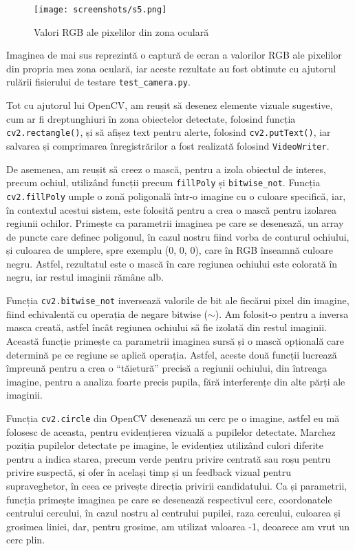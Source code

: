 \documentclass[12pt,a4paper]{article}
\begin{document}
\begin{figure}[H]
    \centering
    \texttt{[image: screenshots/s5.png]}
    \caption{Valori RGB ale pixelilor din zona oculară}
    \label{fig:rgb_ochi}
\end{figure}

Imaginea de mai sus reprezintă o captură de ecran a valorilor RGB ale
pixelilor din propria mea zona oculară, iar aceste rezultate au fost obtinute cu ajutorul rulării fisierului de testare \texttt{test\_camera.py}.


Tot cu ajutorul lui OpenCV, am reușit să desenez elemente vizuale
sugestive, cum ar fi dreptunghiuri în zona obiectelor detectate,
folosind funcția \texttt{cv2.rectangle()}, și să afișez text pentru alerte,
folosind \texttt{cv2.putText()}, iar salvarea și comprimarea înregistrărilor a
fost realizată folosind \texttt{VideoWriter}.

De asemenea, am reușit să creez o mască, pentru a izola obiectul de
interes, precum ochiul, utilizând funcții precum \texttt{fillPoly} și
\texttt{bitwise\_not}. Funcția \texttt{cv2.fillPoly} umple o zonă poligonală într-o imagine
cu o culoare specifică, iar, în contextul acestui sistem, este folosită
pentru a crea o mască pentru izolarea regiunii ochilor. Primește ca
parametrii imaginea pe care se desenează, un array de puncte care
definec poligonul, în cazul nostru fiind vorba de conturul ochiului, și
culoarea de umplere, spre exemplu (0, 0, 0), care în RGB înseamnă
culoare negru. Astfel, rezultatul este o mască în care regiunea ochiului
este colorată în negru, iar restul imaginii rămâne alb.

Funcția \texttt{cv2.bitwise\_not} inversează valorile de bit ale fiecărui pixel
din imagine, fiind echivalentă cu operația de negare bitwise ($\sim$). Am
folosit-o pentru a inversa masca creată, astfel încât regiunea ochiului
să fie izolată din restul imaginii. Această funcție primește ca
parametrii imaginea sursă și o mască opțională care determină pe ce
regiune se aplică operația. Astfel, aceste două funcții lucrează
împreună pentru a crea o ``tăietură'' precisă a regiunii ochiului, din
întreaga imagine, pentru a analiza foarte precis pupila, fără
interferențe din alte părți ale imaginii.

Funcția \texttt{cv2.circle} din OpenCV desenează un cerc pe o imagine, astfel eu
mă folosesc de aceasta, pentru evidențierea vizuală a pupilelor
detectate. Marchez poziția pupilelor detectate pe imagine, le evidențiez
utilizând culori diferite pentru a indica starea, precum verde pentru
privire centrată sau roșu pentru privire suspectă, și ofer în același
timp și un feedback vizual pentru supraveghetor, în ceea ce privește
direcția privirii candidatului. Ca și parametrii, funcția primește
imaginea pe care se desenează respectivul cerc, coordonatele centrului
cercului, în cazul nostru al centrului pupilei, raza cercului, culoarea
și grosimea liniei, dar, pentru grosime, am utilizat valoarea -1,
deoarece am vrut un cerc plin.
\end{document}
